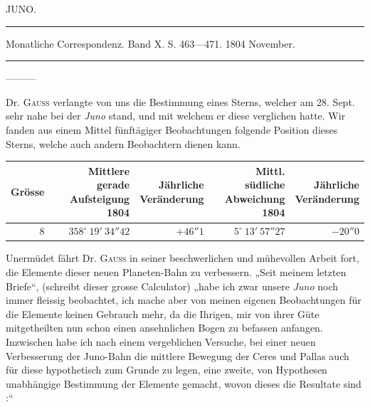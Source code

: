 \par\medskip
{}
\hypertarget{native-261-lower}{}
\begin{center}\large JUNO.\end{center}
\begin{center}\parbox{.86\linewidth}{\centering\footnotesize\frenchspacing
\hrule height .3pt\relax\vspace{2.5pt}
Monatliche Correspondenz. Band X. S. 463—471. 1804 November.\par
\vspace{2.5pt}\hrule height .3pt\relax
}\end{center}
\par\indent ---\enspace---\enspace---\par\nobreak
Dr. \textsc{Gauss} verlangte von uns die Bestimmung eines Sterns, welcher am 28. Sept. sehr nahe bei der \emph{Juno} stand, und mit welchem er diese verglichen hatte. Wir fanden aus einem Mittel fünftägiger Beobachtungen folgende Position dieses Sterns, welche auch andern Beobachtern dienen kann.

\begin{center}
\begingroup\fontsize{9}{11}\selectfont\setlength{\tabcolsep}{3pt}\renewcommand{\arraystretch}{1.1}
\begin{tabular}{r|r|r|r|r}
Grösse & \shortstack{Mittlere gerade\\Aufsteigung\\1804} & \shortstack{Jährliche\\Veränderung} & \shortstack{Mittl. südliche\\Abweichung\\1804} & \shortstack{Jährliche\\Veränderung}\\ \hline
8 & $358^\circ\ 19'\ 34''42$ & $+46''1$ & $5^\circ\ 13'\ 57''27$ & $-20''0$ \\
\end{tabular}\endgroup
\end{center}


Unermüdet fährt Dr. \textsc{Gauss} in seiner beschwerlichen und mühevollen Arbeit fort, die Elemente dieser neuen Planeten-Bahn zu verbessern. „Seit meinem letzten Briefe“, (schreibt dieser grosse Calculator) „habe ich zwar unsere \emph{Juno} noch immer fleissig beobachtet, ich mache aber von meinen eigenen Beobachtungen für die Elemente keinen Gebrauch mehr, da die Ihrigen, mir von ihrer Güte mitgetheilten nun schon einen ansehnlichen Bogen zu befassen anfangen. Inzwischen habe ich nach einem vergeblichen Versuche, bei einer neuen Verbesserung der Juno-Bahn die mittlere Bewegung der Ceres und Pallas auch für diese hypothetisch zum Grunde zu legen, eine zweite, von Hypothesen unabhängige Bestimmung der Elemente gemacht, wovon dieses die Resultate sind :“

